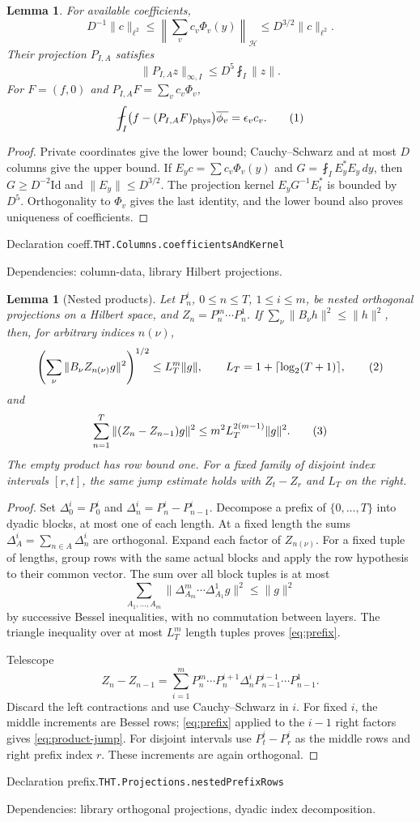 \documentclass[11pt]{article}
\newtheorem{lemma}[theorem]{Lemma}
\theoremstyle{definition}
\newcommand{\avint}{\fint}
\newcommand{\phys}{\mathrm{phys}}
\newcommand{\eqtag}[1]{\refstepcounter{equation}\tag{\theequation}\label{#1}}
\numberwithin{equation}{section}
\newcommand{\bp}[3]{\par\smallskip\begingroup\footnotesize
\noindent\hypertarget{bp:#1}{\textsf{Declaration #1.}}\quad\nolinkurl{#2}\par
\noindent\textsf{Dependencies:} #3.\par\endgroup\smallskip}
\begin{document}
\begin{lemma}\label{lem:coeff}
For available coefficients,
\[
 D^{-1}\|c\|_{\ell^2}\le\left\|\sum_vc_v\Phi_v(y)\right\|_{\mathcal H}
 \le D^{3/2}\|c\|_{\ell^2}.
\]
Their projection $P_{I,A}$ satisfies
\[
 \|P_{I,A}z\|_{\infty,I}\le D^5\avint_I\|z\|.
\]
For $F=(f,0)$ and $P_{I,A}F=\sum_vc_v\Phi_v$,
\[
 \avint_I\bigl(f-(P_{I,A}F)_{\phys}\bigr)\overline{\phi_v}=\epsilon_v c_v.
 \eqtag{eq:predictor-moment}
\]
\end{lemma}
\begin{proof}
Private coordinates give the lower bound; Cauchy--Schwarz and at most $D$ columns give the upper bound. If $E_yc=\sum c_v\Phi_v(y)$ and $G=\avint_I E_y^*E_y\,dy$, then $G\ge D^{-2}\mathrm{Id}$ and $\|E_y\|\le D^{3/2}$. The projection kernel $E_yG^{-1}E_t^*$ is bounded by $D^5$. Orthogonality to $\Phi_v$ gives the last identity, and the lower bound also proves uniqueness of coefficients.
\end{proof}
\bp{coeff}{THT.Columns.coefficientsAndKernel}{column-data, library Hilbert projections}


\begin{lemma}[Nested products]\label{lem:prefix}
Let $P_n^i$, $0\le n\le T$, $1\le i\le m$, be nested orthogonal projections on a Hilbert space, and $Z_n=P_n^m\cdots P_n^1$. If $\sum_\nu\|B_\nu h\|^2\le\|h\|^2$, then, for arbitrary indices $n(\nu)$,
\[
 \left(\sum_\nu\|B_\nu Z_{n(\nu)}g\|^2\right)^{1/2}
 \le L_T^m\|g\|,\qquad L_T=1+\lceil\log_2(T+1)\rceil,
 \eqtag{eq:prefix}
\]
and
\[
 \sum_{n=1}^T\|(Z_n-Z_{n-1})g\|^2\le m^2L_T^{2(m-1)}\|g\|^2.
 \eqtag{eq:product-jump}
\]
The empty product has row bound one. For a fixed family of disjoint index intervals $[r,t]$, the same jump estimate holds with $Z_t-Z_r$ and $L_T$ on the right.
\end{lemma}
\begin{proof}
Set $\Delta_0^i=P_0^i$ and $\Delta_n^i=P_n^i-P_{n-1}^i$. Decompose a prefix of $\{0,\ldots,T\}$ into dyadic blocks, at most one of each length. At a fixed length the sums $\Delta_A^i=\sum_{n\in A}\Delta_n^i$ are orthogonal. Expand each factor of $Z_{n(\nu)}$. For a fixed tuple of lengths, group rows with the same actual blocks and apply the row hypothesis to their common vector. The sum over all block tuples is at most
\[
 \sum_{A_1,\ldots,A_m}\|\Delta_{A_m}^m\cdots\Delta_{A_1}^1g\|^2\le\|g\|^2
\]
by successive Bessel inequalities, with no commutation between layers. The triangle inequality over at most $L_T^m$ length tuples proves \eqref{eq:prefix}.

Telescope
\[
 Z_n-Z_{n-1}=\sum_{i=1}^mP_n^m\cdots P_n^{i+1}\Delta_n^iP_{n-1}^{i-1}\cdots P_{n-1}^1.
\]
Discard the left contractions and use Cauchy--Schwarz in $i$. For fixed $i$, the middle increments are Bessel rows; \eqref{eq:prefix} applied to the $i-1$ right factors gives \eqref{eq:product-jump}. For disjoint intervals use $P_t^i-P_r^i$ as the middle rows and right prefix index $r$. These increments are again orthogonal.
\end{proof}
\bp{prefix}{THT.Projections.nestedPrefixRows}{library orthogonal projections, dyadic index decomposition}
\end{document}
